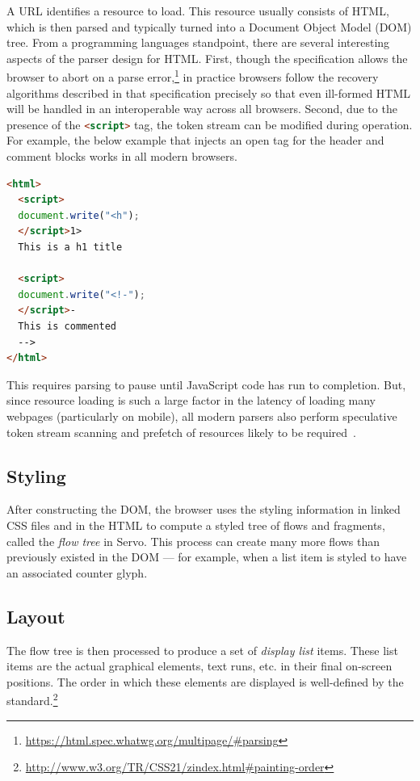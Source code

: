 A URL identifies a resource to load.
This resource usually consists of HTML, which is then parsed and typically turned into a Document Object
Model (DOM) tree.
From a programming languages standpoint, there are several interesting aspects of the parser design
for HTML.
First, though the specification allows the browser to abort on a parse error,\footnote{\url{https://html.spec.whatwg.org/multipage/#parsing}}
in practice browsers follow the recovery algorithms described in that specification precisely so that
even ill-formed HTML will be handled in an interoperable way across all browsers.
Second, due to the presence of the \lstinline[language=HTML]{<script>} tag, the token stream can be modified
during operation.
For example, the below example that injects an open tag for the header and comment blocks works in all modern browsers.
\begin{lstlisting}[language=HTML]
<html>
  <script>
  document.write("<h");
  </script>1>
  This is a h1 title

  <script>
  document.write("<!-");
  </script>-
  This is commented
  -->
</html>
\end{lstlisting}
This requires parsing to pause until JavaScript code has run to completion.
But, since resource loading is such a large factor in the latency of loading many webpages (particularly on mobile),
all modern parsers also perform speculative token stream scanning and prefetch of resources likely to be required~\cite{browsers-slow-smartphones}.

\subsection{Styling}

After constructing the DOM, the browser uses the styling information in linked
CSS files and in the HTML to compute a styled tree of flows and fragments,
called the \emph{flow tree} in Servo.
This process can create many more flows than previously existed in the DOM ---
for example, when a list item is styled to have an associated counter glyph.

\subsection{Layout}

The flow tree is then processed to produce a set of \emph{display list} items.
These list items are the actual graphical elements, text runs, etc. in their
final on-screen positions.
The order in which these elements are displayed is well-defined by the
standard.\footnote{\url{http://www.w3.org/TR/CSS21/zindex.html#painting-order}}

